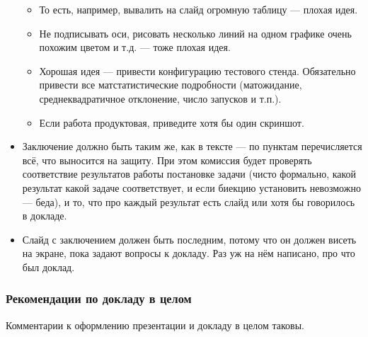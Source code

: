 \documentclass{article}
\begin{document}
\begin{itemize}
    \begin{itemize}
        \item То есть, например, вывалить на слайд огромную таблицу --- плохая идея.
        \item Не подписывать оси, рисовать несколько линий на одном графике очень похожим цветом и т.д. --- тоже плохая идея.
        \item Хорошая идея --- привести конфигурацию тестового стенда. Обязательно привести все матстатистические подробности (матожидание, среднеквадратичное отклонение, число запусков и т.п.).
        \item Если работа продуктовая, приведите хотя бы один скриншот.
    \end{itemize}
    \item Заключение должно быть таким же, как в тексте --- по пунктам перечисляется всё, что выносится на защиту. При этом комиссия будет проверять соответствие результатов работы постановке задачи (чисто формально, какой результат какой задаче соответствует, и если биекцию установить невозможно --- беда), и то, что про каждый результат есть слайд или хотя бы говорилось в докладе.
    \item Слайд с заключением должен быть последним, потому что он должен висеть на экране, пока задают вопросы к докладу. Раз уж на нём написано, про что был доклад.
\end{itemize}

\subsubsection{Рекомендации по докладу в целом}

Комментарии к оформлению презентации и докладу в целом таковы.
\end{document}
